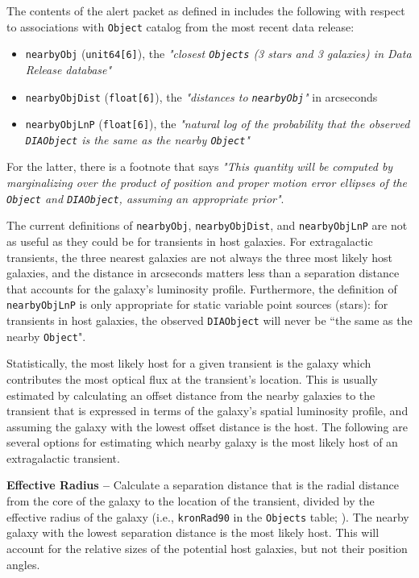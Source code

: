 \documentclass[DM,lsstdraft,authoryear,toc]{lsstdoc}
\begin{document}
The contents of the alert packet as defined in  includes the following with respect to associations with {\tt Object} catalog from the most recent data release:
\begin{itemize}
\item {\tt nearbyObj} ({\tt unit64[6]}), the {\it "closest {\tt Objects} (3 stars and 3 galaxies) in Data Release database"}
\item {\tt nearbyObjDist} ({\tt float[6]}), the {\it "distances to {\tt nearbyObj}"} in arcseconds
\item {\tt nearbyObjLnP} ({\tt float[6]}), the {\it "natural log of the probability that the observed {\tt DIAObject} is the same as the nearby {\tt Object}"}
\end{itemize}
For the latter, there is a footnote that says {\it "This quantity will be computed by marginalizing over the product of position and proper motion error ellipses of the {\tt Object} and {\tt DIAObject}, assuming an appropriate prior"}.

The current definitions of {\tt nearbyObj}, {\tt nearbyObjDist}, and {\tt nearbyObjLnP} are not as useful as they could be for transients in host galaxies. 
For extragalactic transients, the three nearest galaxies are not always the three most likely host galaxies, and the distance in arcseconds matters less than a separation distance that accounts for the galaxy's luminosity profile.
Furthermore, the definition of {\tt nearbyObjLnP} is only appropriate for static variable point sources (stars): for transients in host galaxies, the observed {\tt DIAObject} will never be ``the same as the nearby {\tt Object}".

Statistically, the most likely host for a given transient is the galaxy which contributes the most optical flux at the transient's location.
This is usually estimated by calculating an offset distance from the nearby galaxies to the transient that is expressed in terms of the galaxy's spatial luminosity profile, and assuming the galaxy with the lowest offset distance is the host.
The following are several options for estimating which nearby galaxy is the most likely host of an extragalactic transient.

{\bf Effective Radius --} Calculate a separation distance that is the radial distance from the core of the galaxy to the location of the transient, divided by the effective radius of the galaxy (i.e., {\tt kronRad90} in the {\tt Objects} table; ).
The nearby galaxy with the lowest separation distance is the most likely host. This will account for the relative sizes of the potential host galaxies, but not their position angles. 
\end{document}
